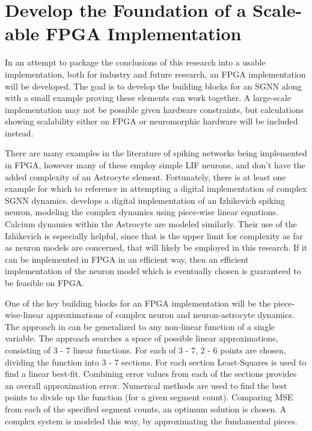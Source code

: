    \section{Develop the Foundation of a Scale-able FPGA Implementation}
    In an attempt to package the conclusions of this research into a usable
    implementation, both for industry and future research, an FPGA
    implementation will be developed. The goal is to develop the building blocks
    for an SGNN along with a small example proving these elements can work
    together. A large-scale implementation may not be possible given hardware
    constraints, but calculations showing scalability either on FPGA or
    neuromorphic hardware will be included instead.
    
    There are many examples in the literature of spiking networks being
    implemented in FPGA, however many of these employ simple LIF neurons, and
    don't have the added complexity of an Astrocyte element. Fortunately, there
    is at least one example for which to reference in attempting a digital
    implementation of complex SGNN dynamics. \cite{fpga_sgnn} develops a digital
    implementation of an Izhikevich spiking neuron, modeling the complex
    dynamics using piece-wise linear equations. Calcium dynamics within the
    Astrocyte are modeled similarly. Their use of the Izhikevich is especially
    helpful, since that is the upper limit for complexity as far as neuron
    models are concerned, that will likely be employed in this research. If it
    can be implemented in FPGA in an efficient way, then an efficient
    implementation of the neuron model which is eventually chosen is guaranteed
    to be feasible on FPGA.
    
    One of the key building blocks for an FPGA implementation will be the
    piece-wise-linear approximations of complex neuron and neuron-astrocyte
    dynamics. The approach in \cite{fpga_sgnn} can be generalized to any
    non-linear function of a single variable. The approach searches a space of
    possible linear approximations, consisting of 3 - 7 linear functions. For
    each of 3 - 7, 2 - 6 points are chosen, dividing the function into 3 - 7
    sections. For each section Least-Squares is used to find a linear
    best-fit. Combining error values from each of the sections provides an
    overall approximation error. Numerical methods are used to find the best
    points to divide up the function (for a given segment count). Comparing MSE
    from each of the specified segment counts, an optimum solution is chosen. A
    complex system is modeled this way, by approximating the fundamental pieces.
    
